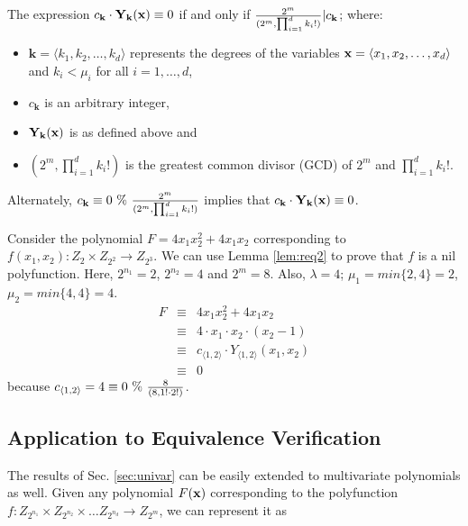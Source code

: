 \begin{Lemma}\label{lem:req2}
The expression $c_\textbf{k}\cdot \textbf{Y}_\textbf{k}({\bf x}) \equiv 0$ if
and only if $ {{2^m} \over {
    (2^m,\prod_{i=1}^{d}k_i!)}}|c_\textbf{k}$; where:
\begin{itemize}
\item $\textbf{k} = \langle k_1, k_2, \ldots, k_d \rangle$ represents
  the degrees of the variables ${\bf x} = \langle x_1, x_2, \ldots,
  x_d \rangle$ and $k_i < \mu_i$ for all $i
  = 1, \ldots, d$,
\item $c_\textbf{k}$ is an arbitrary integer,
\item ${\bf Y}_{\bf k} ({\bf x})$ is as defined above and
\item ${(2^m,\prod_{i=1}^{d}k_i!)}$ is the greatest common divisor (GCD)
  of $2^m$ and $\prod_{i=1}^{d}k_i!$.
\end{itemize}
Alternately, $ c_{\bf k} \equiv 0 ~\% ~{{2^m} \over {
    (2^m,\prod_{i=1}^{d}k_i!)}}$ implies that $c_\textbf{k}\cdot
    \textbf{Y}_\textbf{k}({\bf x}) \equiv 0$.
\end{Lemma}

\begin{Example}\label{ex:req2}
Consider the polynomial $F = 4x_1 x_2^2 + 4x_1 x_2$ corresponding to
$f(x_1, x_2): Z_{2} \times Z_{2^2} \rightarrow Z_{2^3}$. We can use
Lemma \ref{lem:req2} to prove that $f$ is a nil polyfunction.  Here,
$2^{n_1}=2$, $2^{n_2} = 4$ and $2^m = 8$. Also, $\lambda = 4$;
$\mu_1 = min\{2, 4\} = 2$, $\mu_2 = min\{4, 4\} = 4$.
\begin{eqnarray}
F &\equiv& 4x_1 x_2^2 + 4x_1 x_2 \nonumber \\ 
  &\equiv& 4 \cdot x_1\cdot x_2\cdot(x_2-1)\nonumber\\ 
  &\equiv& c_{\langle 1, 2 \rangle} \cdot Y_{\langle 1,2 \rangle}(x_1, x_2) \nonumber\\ 
  &\equiv& 0 \nonumber
\end{eqnarray}
because $c_{\langle 1, 2 \rangle} = 4  \equiv 0 ~\% ~{{8}\over{(8,1!\cdot 2!)}}$.
\end{Example}

\subsection{ Application to Equivalence Verification }
The results of Sec. \ref{sec:univar} can be easily extended to
multivariate polynomials as well. Given any polynomial $F({\bf x})$
corresponding to the polyfunction $f:Z_{2^{n_1}} \times Z_{2^{n_2}}
\times \ldots Z_{2^{n_d}} \rightarrow Z_{2^m}$, we can represent it as

